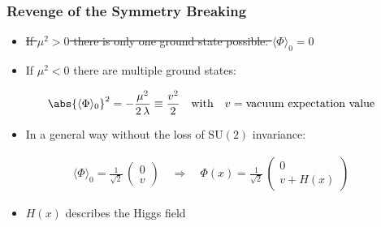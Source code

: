 \documentclass[xcolor={usenames,dvipsnames,svgnames,table}]{beamer}
\newcommand{\av}[1]{\ensuremath{\langle #1 \rangle}\xspace}
\begin{document}
\begin{frame}
    \frametitle{Revenge of the Symmetry Breaking}
    \begin{itemize}
        \item \sout{If $\mu^2>0$ there is only one ground state possible: $\av{\Phi}_0=0$}
        \item If $\mu^2<0$ there are multiple ground states:
    \end{itemize}
    \begin{gather*}
        \abs{\av{\Phi}_0}^2 = -\frac{\mu^2}{2 \, \lambda} \equiv \frac{v^2}{2} \quad \text{with} \quad v=\text{vacuum expectation value}
    \end{gather*}
    \begin{itemize}
        \item In a general way without the loss of $\mathrm{SU}(2)$ invariance:
    \end{itemize}
    \begin{gather*}
        \av{\Phi}_0 = \frac{1}{\sqrt 2} \, \begin{pmatrix} 0 \\ v \end{pmatrix} \quad \Rightarrow \quad \Phi(x) = \frac{1}{\sqrt 2} \, \begin{pmatrix} 0 \\ v + H(x) \end{pmatrix}
    \end{gather*}
    \begin{itemize}
        \item $H(x)$ describes the Higgs field
    \end{itemize}
\end{frame}
\end{document}
